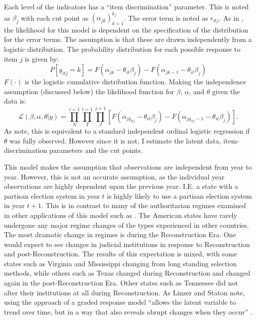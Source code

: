 \documentclass[12pt]{article}
\begin{document}
Each level of the indicators has a ``item discrimination'' parameter.  This is noted as $\beta_j$ with each cut point as $(\alpha_{jk})^{k_j}_{k=1}$.  The error term is noted as $\epsilon_{itj}$.  As in \citet{Schnakenberg2014}, the likelihood for this model is dependent on the specification of the distribution for the error terms.  The assumption is that these are drawn independently from a logistic distribution.  The probability distribution for each possible response to item $j$ is given by:
\begin{equation*}
P[y_{itj}=k]=F(\alpha_{jk}-\theta_{it}\beta_j)-F(\alpha_{jk-1}-\theta_{it}\beta_j)
\end{equation*} 
  $F(\cdot)$ is the logistic cumulative distribution function.  Making the independence assumption (discussed below) the likelihood function for $\beta$, $\alpha$, and $\theta$ given the data is:
  \begin{equation*}
  \mathcal{L}(\beta,\alpha,\theta|y)=\prod_{N}^{i=1}\prod_{T}^{t=1}\prod_{J}^{j=1}[F(\alpha_{jy_{itj}}-\theta_{it}\beta_j)-F(\alpha_{jy_{itj}-1}-\theta_{it}\beta_j)].
  \end{equation*}
As \citet{Schnakenberg2014} note, this is equivalent to a standard independent ordinal logistic regression if $\theta$ was fully observed.  However since it is not, I estimate the latent data, item-discrimination parameters and the cut points.

This model makes the assumption that observations are independent from year to year.  However, this is not an accurate assumption, as the individual year observations are highly dependent upon the previous year.  I.E. a state with a partisan election system in year $t$ is highly likely to use a partisan election system in year $t+1$. This is in contrast to many of the authoritarian regimes examined in other applications of this model such as \citet{Treier2008,Schnakenberg2014,Linzer2014}. The American states have rarely undergone any major regime changes of the types experienced in  other countries.  The most dramatic change in regimes is during the Reconstruction Era.  One would expect to see changes in judicial institutions in response to Reconstruction and post-Reconstruction.  The results of this expectation is mixed, with some states such as Virginia and Mississippi changing from long standing selection methods, while others such as Texas changed during Reconstruction and changed again in the post-Reconstruction Era.  Other states such as Tennessee did not alter their institutions at all during Reconstruction. As Linzer and Staton note, using the approach of a graded response model ``allows the latent variable to trend over time, but in a way that also reveals abrupt changes when they occur'' \citep[9]{Linzer2014}.
\end{document}
